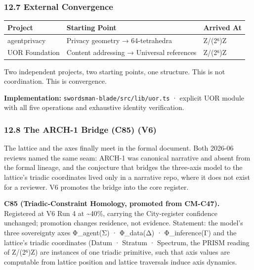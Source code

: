 \documentclass[
  11pt,
]{article}
\newcounter{none} %
\begin{document}
\subsubsection{12.7 External Convergence}\label{external-convergence}

{\def\LTcaptype{none} %
\begin{longtable}[]{@{}lll@{}}
\toprule\noalign{}
Project & Starting Point & Arrived At \\
\midrule\noalign{}
\endhead
\bottomrule\noalign{}
\endlastfoot
agentprivacy & Privacy geometry → 64-tetrahedra & Z/(2⁶)Z \\
UOR Foundation & Content addressing → Universal references & Z/(2⁶)Z \\
\end{longtable}
}

Two independent projects, two starting points, one structure. This is
not coordination. This is convergence.

\textbf{Implementation:} \texttt{swordsman-blade/src/lib/uor.ts} ·
explicit UOR module with all five operations and exhaustive identity
verification.

\subsubsection{12.8 The ARCH-1 Bridge (C85)
(V6)}\label{the-arch-1-bridge-c85-v6}

The lattice and the axes finally meet in the formal document. Both
2026-06 reviews named the same seam: ARCH-1 was canonical narrative and
absent from the formal lineage, and the conjecture that bridges the
three-axis model to the lattice's triadic coordinates lived only in a
narrative repo, where it does not exist for a reviewer. V6 promotes the
bridge into the core register.

\textbf{C85 (Triadic-Constraint Homology, promoted from CM-C47).}
Registered at V6 Run 4 at \textasciitilde40\%, carrying the
City-register confidence unchanged; promotion changes residence, not
evidence. Statement: the model's three sovereignty axes Φ\_agent(Σ) ·
Φ\_data(Δ) · Φ\_inference(Γ) and the lattice's triadic coordinates
(Datum · Stratum · Spectrum, the PRISM reading of Z/(2⁶)Z) are instances
of one triadic primitive, such that axis values are computable from
lattice position and lattice traversals induce axis dynamics.
\end{document}

